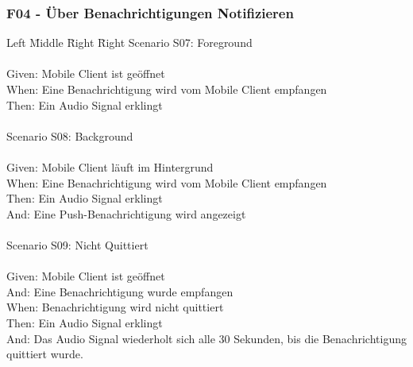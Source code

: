 \subsubsection*{F04 - Über Benachrichtigungen Notifizieren}
\begin{tabbing}
    Left \= Middle \= Right \= Right  \kill
    Scenario S07: \> \> \>  Foreground\\ \\
    Given: \> \> \>   Mobile Client ist geöffnet\\
    When: \> \> \>    Eine Benachrichtigung wird vom Mobile Client empfangen\\
    Then: \> \> \>    Ein Audio Signal erklingt\\
    \\
    Scenario S08: \> \> \>  Background\\ \\
    Given: \> \> \>   Mobile Client läuft im Hintergrund\\
    When: \> \> \>    Eine Benachrichtigung wird vom Mobile Client empfangen\\
    Then: \> \> \>    Ein Audio Signal erklingt\\
    And: \> \> \>     Eine Push-Benachrichtigung wird angezeigt\\
    \\
    Scenario S09: \> \> \>  Nicht Quittiert\\ \\
    Given: \> \> \>   Mobile Client ist geöffnet\\
    And: \> \> \>     Eine Benachrichtigung wurde empfangen\\
    When: \> \> \>    Benachrichtigung wird nicht quittiert\\
    Then: \> \> \>    Ein Audio Signal erklingt\\
    And: \> \> \>     Das Audio Signal wiederholt sich alle 30 Sekunden, bis die Benachrichtigung quittiert wurde.\\
\end{tabbing}

\clearpage

